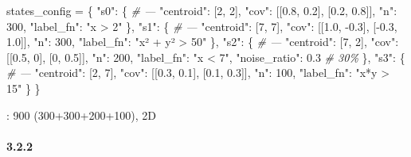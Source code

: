 \documentclass[
  12pt,
]{article}
\newenvironment{Shaded}{}{}
\newcommand{\CommentTok}[1]{\textcolor[rgb]{0.38,0.63,0.69}{\textit{#1}}}
\newcommand{\DecValTok}[1]{\textcolor[rgb]{0.25,0.63,0.44}{#1}}
\newcommand{\FloatTok}[1]{\textcolor[rgb]{0.25,0.63,0.44}{#1}}
\newcommand{\NormalTok}[1]{#1}
\newcommand{\OperatorTok}[1]{\textcolor[rgb]{0.40,0.40,0.40}{#1}}
\newcommand{\StringTok}[1]{\textcolor[rgb]{0.25,0.44,0.63}{#1}}
\begin{document}
\begin{Shaded}
\begin{Highlighting}[]
\NormalTok{states\_config }\OperatorTok{=}\NormalTok{ \{}
    \StringTok{"s0"}\NormalTok{: \{  }\CommentTok{\#  — }
        \StringTok{"centroid"}\NormalTok{: [}\DecValTok{2}\NormalTok{, }\DecValTok{2}\NormalTok{], }\StringTok{"cov"}\NormalTok{: [[}\FloatTok{0.8}\NormalTok{, }\FloatTok{0.2}\NormalTok{], [}\FloatTok{0.2}\NormalTok{, }\FloatTok{0.8}\NormalTok{]], }\StringTok{"n"}\NormalTok{: }\DecValTok{300}\NormalTok{, }\StringTok{"label\_fn"}\NormalTok{: }\StringTok{"x \textgreater{} 2"}
\NormalTok{    \},}
    \StringTok{"s1"}\NormalTok{: \{  }\CommentTok{\#  — }
        \StringTok{"centroid"}\NormalTok{: [}\DecValTok{7}\NormalTok{, }\DecValTok{7}\NormalTok{], }\StringTok{"cov"}\NormalTok{: [[}\FloatTok{1.0}\NormalTok{, }\OperatorTok{{-}}\FloatTok{0.3}\NormalTok{], [}\OperatorTok{{-}}\FloatTok{0.3}\NormalTok{, }\FloatTok{1.0}\NormalTok{]], }\StringTok{"n"}\NormalTok{: }\DecValTok{300}\NormalTok{, }\StringTok{"label\_fn"}\NormalTok{: }\StringTok{"x² + y² \textgreater{} 50"}
\NormalTok{    \},}
    \StringTok{"s2"}\NormalTok{: \{  }\CommentTok{\#  — }
        \StringTok{"centroid"}\NormalTok{: [}\DecValTok{7}\NormalTok{, }\DecValTok{2}\NormalTok{], }\StringTok{"cov"}\NormalTok{: [[}\FloatTok{0.5}\NormalTok{, }\DecValTok{0}\NormalTok{], [}\DecValTok{0}\NormalTok{, }\FloatTok{0.5}\NormalTok{]], }\StringTok{"n"}\NormalTok{: }\DecValTok{200}\NormalTok{, }\StringTok{"label\_fn"}\NormalTok{: }\StringTok{"x \textless{} 7"}\NormalTok{,}
        \StringTok{"noise\_ratio"}\NormalTok{: }\FloatTok{0.3}    \CommentTok{\# 30\% }
\NormalTok{    \},}
    \StringTok{"s3"}\NormalTok{: \{  }\CommentTok{\#  — }
        \StringTok{"centroid"}\NormalTok{: [}\DecValTok{2}\NormalTok{, }\DecValTok{7}\NormalTok{], }\StringTok{"cov"}\NormalTok{: [[}\FloatTok{0.3}\NormalTok{, }\FloatTok{0.1}\NormalTok{], [}\FloatTok{0.1}\NormalTok{, }\FloatTok{0.3}\NormalTok{]], }\StringTok{"n"}\NormalTok{: }\DecValTok{100}\NormalTok{, }\StringTok{"label\_fn"}\NormalTok{: }\StringTok{"x*y \textgreater{} 15"}
\NormalTok{    \}}
\NormalTok{\}}
\end{Highlighting}
\end{Shaded}

: 900 (300+300+200+100), 2D 

\paragraph{3.2.2 }\label{ux4e13ux5bb6ux8bbeux8ba1}
\end{document}
